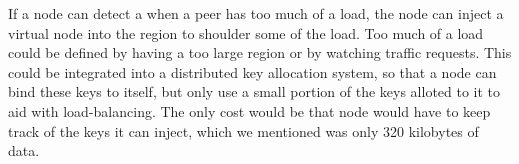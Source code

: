 \documentclass[11pt,conference]{IEEEtran}
\begin{document}
If a node can detect a when a peer has too much of a load, the node can inject a virtual node into the region to shoulder some of the load.
Too much of a load could be defined by having a too large region or by watching traffic requests.
This could be integrated into a distributed key allocation system, so that a node can bind these keys to itself, but only use a small portion of the keys alloted to it to aid with load-balancing.
The only cost would be that node would have to keep track of the keys it can inject, which we mentioned was only 320 kilobytes of data.



\end{document}

